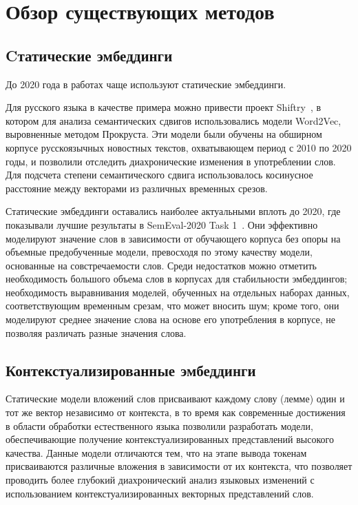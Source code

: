 \documentclass[LI,VKR]{HSEUniversity}
\begin{document}
\section{Обзор существующих методов}

\subsection{Cтатические эмбеддинги}

До 2020 года в работах чаще используют статические эмбеддинги.

Для русского языка в качестве примера можно привести проект Shiftry~\cite{shiftry},
в котором для анализа семантических сдвигов использовались модели Word2Vec,
выровненные методом Прокруста.
Эти модели были обучены на обширном корпусе русскоязычных новостных текстов,
охватывающем период с 2010 по 2020 годы, и позволили отследить диахронические изменения
в употреблении слов.
Для подсчета степени семантического сдвига использовалось косинусное расстояние между
векторами из различных временных срезов.

Статические эмбеддинги оставались наиболее актуальными вплоть до 2020,
где показывали лучшие результаты в SemEval-2020 Task 1~\cite{semeval2020task}.
Они эффективно моделируют значение слов в зависимости от обучающего корпуса
без опоры на объемные предобученные модели,
превосходя по этому качеству модели, основанные на совстречаемости слов.
Среди недостатков можно отметить необходимость большого объема слов в корпусах
для стабильности эмбеддингов;
необходимость выравнивания моделей, обученных на отдельных наборах данных,
соответствующим временным срезам, что может вносить шум;
кроме того, они моделируют среднее значение слова на основе его употребления в корпусе,
не позволяя различать разные значения слова.

\subsection{Контекстуализированные эмбеддинги}

Статические модели вложений слов присваивают каждому слову (лемме) один и тот же вектор
независимо от контекста, в то время как современные достижения в области обработки
естественного языка позволили разработать модели,
обеспечивающие получение контекстуализированных представлений высокого качества.
Данные модели отличаются тем, что на этапе вывода токенам присваиваются различные вложения
в зависимости от их контекста, что позволяет проводить более глубокий диахронический
анализ языковых изменений с использованием контекстуализированных векторных представлений слов.
\end{document}
